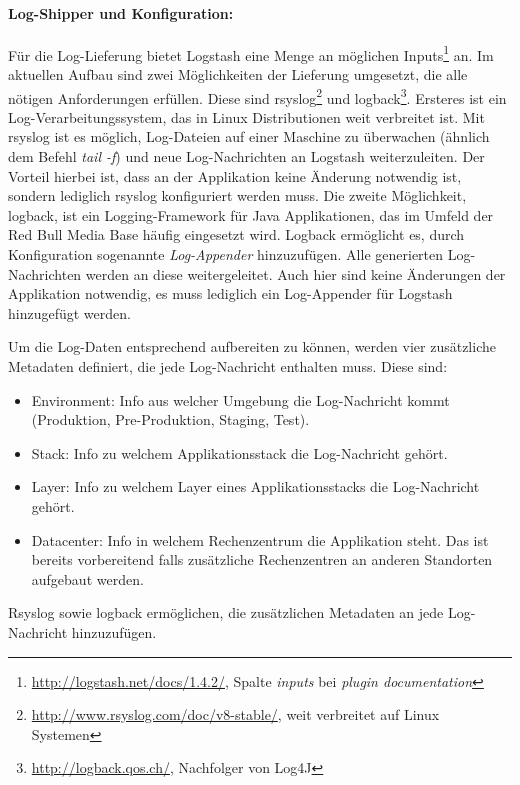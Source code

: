 \paragraph{Log-Shipper und Konfiguration:}
\label{sec:logstash:shipper}
Für die Log-Lieferung bietet Logstash eine Menge an möglichen Inputs\footnote{\url{http://logstash.net/docs/1.4.2/}, Spalte \textit{inputs} bei \textit{plugin documentation}} an. Im aktuellen Aufbau sind zwei Möglichkeiten der Lieferung umgesetzt, die alle nötigen Anforderungen erfüllen. Diese sind rsyslog\footnote{\url{http://www.rsyslog.com/doc/v8-stable/}, weit verbreitet auf Linux Systemen} und logback\footnote{\url{http://logback.qos.ch/}, Nachfolger von Log4J}. Ersteres ist ein Log-Verarbeitungssystem, das in Linux Distributionen weit verbreitet ist. Mit rsyslog ist es möglich, Log-Dateien auf einer Maschine zu überwachen (ähnlich dem Befehl \textit{tail -f}) und neue Log-Nachrichten an Logstash weiterzuleiten. Der Vorteil hierbei ist, dass an der Applikation keine Änderung notwendig ist, sondern lediglich rsyslog konfiguriert werden muss. Die zweite Möglichkeit, logback, ist ein Logging-Framework für Java Applikationen, das im Umfeld der Red Bull Media Base häufig eingesetzt wird. Logback ermöglicht es, durch Konfiguration sogenannte \textit{Log-Appender} hinzuzufügen. Alle generierten Log-Nachrichten werden an diese weitergeleitet. Auch hier sind keine Änderungen der Applikation notwendig, es muss lediglich ein Log-Appender für Logstash hinzugefügt werden.

Um die Log-Daten entsprechend aufbereiten zu können, werden vier zusätzliche Metadaten definiert, die jede Log-Nachricht enthalten muss. Diese sind:
\begin{itemize}
\item Environment: Info aus welcher Umgebung die Log-Nachricht kommt (Produktion, Pre-Produktion, Staging, Test).
\item Stack: Info zu welchem Applikationsstack die Log-Nachricht gehört.
\item Layer: Info zu welchem Layer eines Applikationsstacks die Log-Nachricht gehört.
\item Datacenter: Info in welchem Rechenzentrum die Applikation steht. Das ist bereits vorbereitend falls zusätzliche Rechenzentren an anderen Standorten aufgebaut werden.
\end{itemize}
Rsyslog sowie logback ermöglichen, die zusätzlichen Metadaten an jede Log-Nachricht hinzuzufügen.

